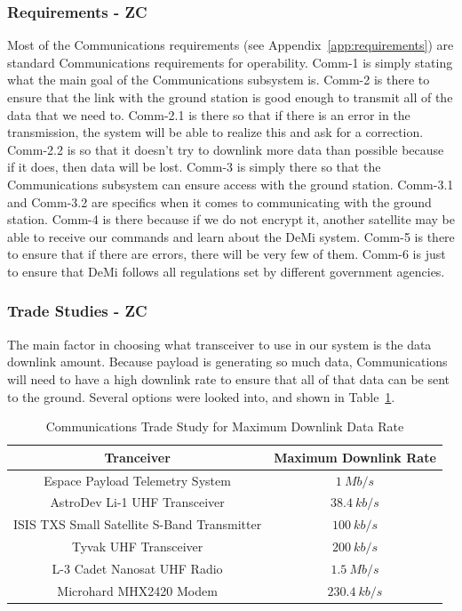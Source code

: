 \documentclass[12pt]{article}
\begin{document}
			\subsubsection{Requirements - ZC}

Most of the Communications requirements (see Appendix~\ref{app:requirements}) are standard Communications requirements for operability. Comm-1 is simply stating what the main goal of the Communications subsystem is. Comm-2 is there to ensure that the link with the ground station is good enough to transmit all of the data that we need to. Comm-2.1 is there so that if there is an error in the transmission, the system will be able to realize this and ask for a correction. Comm-2.2 is so that it doesn’t try to downlink more data than possible because if it does, then data will be lost. Comm-3 is simply there so that the Communications subsystem can ensure access with the ground station. Comm-3.1 and Comm-3.2 are specifics when it comes to communicating with the ground station. Comm-4 is there because if we do not encrypt it, another satellite may be able to receive our commands and learn about the DeMi system. Comm-5 is there to ensure that if there are errors, there will be very few of them. Comm-6 is just to ensure that DeMi follows all regulations set by different government agencies.

			\subsubsection{Trade Studies - ZC}\label{sec:comm_tradestudies}
The main factor in choosing what transceiver to use in our system is the data downlink amount. Because payload is generating so much data, Communications will need to have a high downlink rate to ensure that all of that data can be sent to the ground. Several options were looked into, and shown in Table~\ref{table:comm_transceivers}.

\begin{table}[ht]
\caption{Communications Trade Study for Maximum Downlink Data Rate}
\label{table:comm_transceivers}
\begin{center}
    \begin{tabular}{| c | c |} \hline
    	Tranceiver & Maximum Downlink Rate \\ \hline \hline
Espace Payload Telemetry System & $1\ Mb/s$ \\
AstroDev Li-1 UHF Transceiver & $38.4\ kb/s$ \\
ISIS TXS Small Satellite  S-Band Transmitter & $100\ kb/s$ \\
Tyvak UHF Transceiver & $200\ kb/s$ \\
L-3 Cadet Nanosat UHF Radio & $1.5\ Mb/s$ \\
Microhard MHX2420 Modem & $230.4\ kb/s$ \\ \hline 
    \end{tabular}
\end{center}
\end{table}
\end{document}
